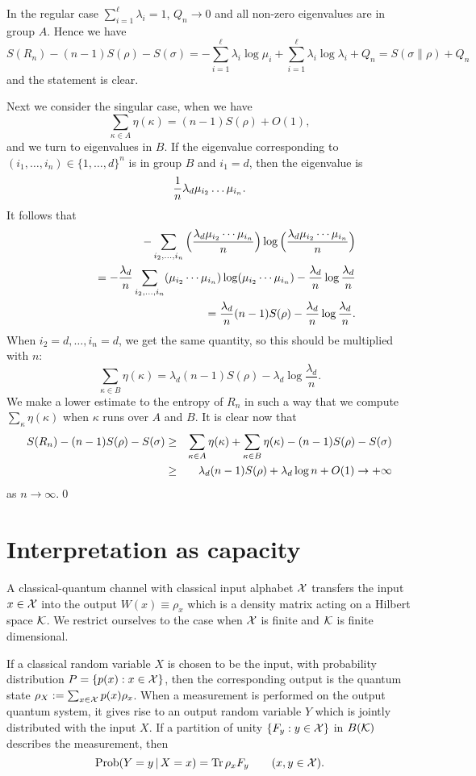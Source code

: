 \documentclass[12pt,a4paper]{article}
\def\Tr{{\mathrm{Tr}}}
\def\Prob{{\mathrm{Prob}}}
\def\iK{{\cal K}}
\def\iX{{\cal X}}
\begin{document}
In the regular case $\sum_{i=1}^\ell \lambda_i=1$, $Q_n \to 0$ and all
non-zero eigenvalues are in group $A$. Hence we have
$$
S(R_n)-(n-1)S(\rho)-S(\sigma)
=-\sum_{i=1}^\ell\lambda_i\log\mu_i+ \sum_{i=1}^\ell \lambda_i\log\lambda_i +Q_n
=S(\sigma\|\rho)+Q_n
$$
and the statement is clear.

Next we consider the singular case, when we have
$$
\sum_{\kappa \in A} \eta(\kappa)=(n-1)S(\rho)+ O(1),
$$
and we turn to eigenvalues in $B$. If the eigenvalue corresponding to
$(i_1,\dots ,i_n)\in\{1,\dots,d\}^n$ is in group $B$ and $i_1=d$, then
the eigenvalue is
$$
{1\over n}\lambda_{d}\mu_{i_2}\dots\mu_{i_n}.
$$
It follows that
\begin{eqnarray*}
&& -\sum_{i_2,\dots,i_n}
\Big(\frac{\lambda_d\mu_{i_2}\cdots\mu_{i_n}}{n}\Big)
\log \Big(\frac{\lambda_d\mu_{i_2}\cdots\mu_{i_n}}{n}\Big)
\cr
&&\qquad = -\frac{\lambda_d}{n}\sum_{i_2,\dots,i_n}
(\mu_{i_2}\cdots\mu_{i_n}) \log (\mu_{i_2}\cdots\mu_{i_n})
-\frac{\lambda_d}{n}\log \frac{\lambda_d}{n}
\cr
&&\qquad
= \frac{\lambda_d}{n}(n-1)S(\rho)-\frac{\lambda_d}{n}\log \frac{\lambda_d}{n}.
\end{eqnarray*}
When $i_2=d, \dots, i_n=d$, we get the same quantity, so this should be
multiplied with $n$:
$$
\sum_{\kappa \in B} \eta(\kappa)=
\lambda_d (n-1)S(\rho)- \lambda_d \log \frac{\lambda_d}{n}.
$$
We make a lower estimate to the entropy of $R_n$ in such a way that we
compute $\sum_\kappa \eta(\kappa)$ when $\kappa$ runs over $A$ and $B$.
It is clear now that
\begin{eqnarray*}
S(R_n)- (n-1)S(\rho)-S(\sigma)
&\ge& \sum_{\kappa \in A} \eta(\kappa)+\sum_{\kappa \in B} \eta(\kappa)-
(n-1)S(\rho)-S(\sigma) \cr
&\ge& \lambda_d (n-1)S(\rho)+\lambda_d \log n + O(1)
\to +\infty
\end{eqnarray*}
as $n \to \infty$.\qed

\section{Interpretation as capacity}

A classical-quantum channel with classical input alphabet $\iX$ transfers the input
$x\in \iX$ into the output $W(x) \equiv \rho_x$ which is a density matrix acting
on a Hilbert space $\iK$. We restrict ourselves to the case when $\iX$ is finite and
$\iK$ is finite dimensional.

If a classical random variable $X$ is chosen to be the input, with probability
distribution $P=\{p(x): x \in \iX\}$, then the corresponding output is the
quantum state $\rho_X:= \sum_{x \in \iX} p(x) \rho_x$. When a measurement
is performed on the output quantum system, it gives rise to an output
random variable $Y$ which is jointly distributed with the input $X$. If a partition
of unity $\{F_y :y \in \iX\}$ in $B(\iK)$ describes the measurement, then
\begin{equation}\label{E:tr}
\Prob (Y=y\, |\, X=x )= \Tr\, \rho_x F_y \qquad (x,y \in \iX).
\end{equation}
\end{document}

